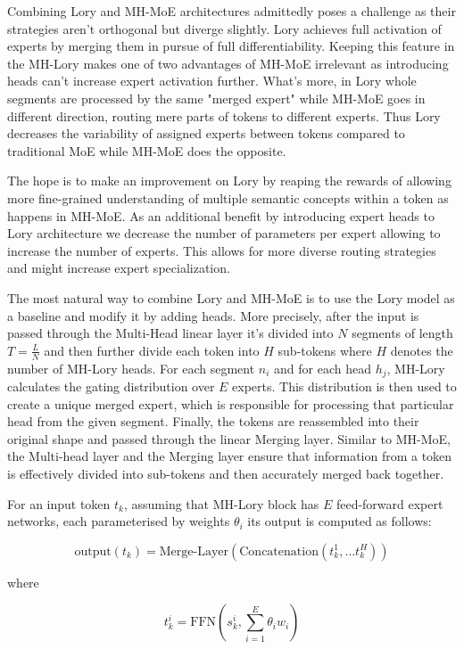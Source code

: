 \documentclass[12pt]{article}
\begin{document}
Combining Lory and MH-MoE architectures admittedly poses a challenge as their strategies aren't orthogonal but diverge slightly. Lory achieves full activation of experts by merging them in pursue of full differentiability. Keeping this feature in the MH-Lory makes one of two advantages of MH-MoE irrelevant as introducing heads can't increase expert activation further. What's more, in Lory whole segments are processed by the same "merged expert" while MH-MoE goes in different direction, routing mere parts of tokens to different experts. Thus Lory decreases the variability of assigned experts between tokens compared to traditional MoE while MH-MoE does the opposite.

The hope is to make an improvement on Lory by reaping the rewards of allowing more fine-grained understanding of multiple semantic concepts within a token as happens in MH-MoE. As an additional benefit by introducing expert heads to Lory architecture we decrease the number of parameters per expert allowing to increase the number of experts. This allows for more diverse routing strategies and might increase expert specialization.

The most natural way to combine Lory and MH-MoE is to use the Lory model as a baseline and modify it by adding heads. More precisely, after the input is passed through the Multi-Head linear layer 
it's divided into $N$ segments of length $T=\frac{L}{N}$ and then further divide each token into $H$ sub-tokens where $H$ denotes the number of MH-Lory heads.
For each segment $n_i$ and for each head $h_j$, MH-Lory calculates the gating distribution over $E$ experts. This distribution is then used to create a unique merged expert, which is responsible for processing that particular head from the given segment. Finally, the tokens are reassembled into their original shape and passed through the linear Merging layer. Similar to MH-MoE, the Multi-head layer and the Merging layer ensure that information from a token is effectively divided into sub-tokens and then accurately merged back together.

For an input token $t_k$, assuming that MH-Lory block has $E$ feed-forward expert networks, each parameterised by weights $\theta_i$ its output is computed as follows:

\[\text{output}(t_k) = \text{Merge-Layer}(\text{Concatenation}(t_k^1, \dots t_k^H))\] 

where

\[t_k^i =  \text{FFN}(s_k^i, \sum_{i=1}^E \theta_i w_i)\]
\end{document}
